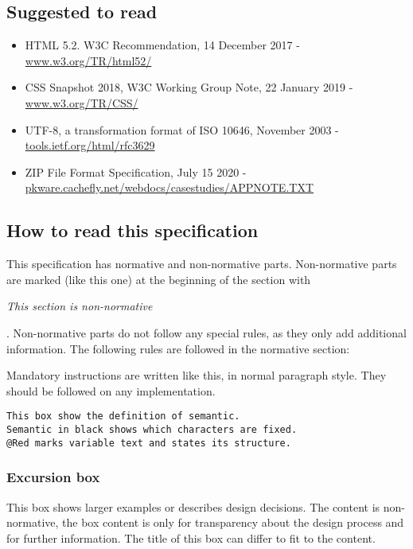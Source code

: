 \documentclass[12pt,a4paper]{article}
\begin{document}
\subsection{Suggested to read}

\begin{itemize}
\item HTML 5.2. W3C Recommendation, 14 December 2017 - \url{www.w3.org/TR/html52/}
\item CSS Snapshot 2018, W3C Working Group Note, 22 January 2019 - \url{www.w3.org/TR/CSS/}
\item UTF-8, a transformation format of ISO 10646, November 2003 - \url{tools.ietf.org/html/rfc3629}
\item ZIP File Format Specification, July 15 2020 - \url{pkware.cachefly.net/webdocs/casestudies/APPNOTE.TXT}
\end{itemize}

\subsection{How to read this specification}

This specification has normative and non-normative parts. Non-normative parts are marked (like this one) at the beginning of the section with \begin{small}\textit{This section is non-normative}\end{small}. Non-normative parts do not follow any special rules, as they only add additional information. The following rules are followed in the normative section:

Mandatory instructions are written like this, in normal paragraph style. They should be followed on any implementation.

\begin{lstlisting}[frame=single,style=base]
This box show the definition of semantic.
Semantic in black shows which characters are fixed.
@Red marks variable text and states its structure.
\end{lstlisting}

\begin{tcolorbox}
\subsubsection*{Excursion box}
This box shows larger examples or describes design decisions. The content is non-normative, the box content is only for transparency about the design process and for further information. The title of this box can differ to fit to the content.
\end{tcolorbox}
\end{document}
